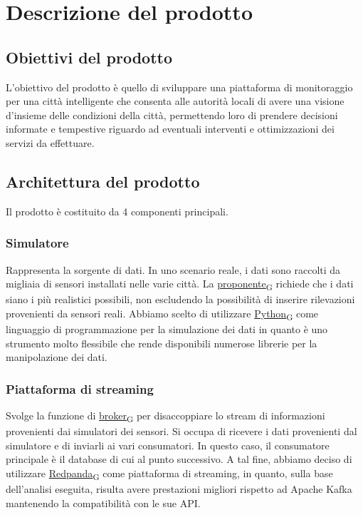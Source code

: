 \section{Descrizione del prodotto}
\subsection{Obiettivi del prodotto}
L'obiettivo del prodotto è quello di sviluppare una piattaforma di monitoraggio per una città intelligente che consenta alle autorità locali di avere una visione d'insieme delle condizioni della città, permettendo loro di prendere decisioni informate e tempestive riguardo ad eventuali interventi e ottimizzazioni dei servizi da effettuare.

\subsection{Architettura del prodotto}
Il prodotto è costituito da 4 componenti principali.
	\subsubsection*{Simulatore} 
	Rappresenta la sorgente di dati. In uno scenario reale, i dati sono raccolti da migliaia di sensori installati nelle varie città. La \href{https://7last.github.io/docs/rtb/documentazione-interna/glossario\#proponente}{proponente\textsubscript{G}} richiede che i dati siano i più realistici possibili, non escludendo la possibilità di inserire rilevazioni provenienti da sensori reali. Abbiamo scelto di utilizzare \href{https://7last.github.io/docs/rtb/documentazione-interna/glossario\#python}{Python\textsubscript{G}} come linguaggio di programmazione per la simulazione dei dati in quanto è uno strumento molto flessibile che rende disponibili numerose librerie per la manipolazione dei dati.
	\subsubsection*{Piattaforma di streaming}
	Svolge la funzione di \href{https://7last.github.io/docs/rtb/documentazione-interna/glossario\#broker}{broker\textsubscript{G}} per disaccoppiare lo stream di informazioni provenienti dai simulatori dei sensori. Si occupa di ricevere i dati provenienti dal simulatore e di inviarli ai vari consumatori. In questo caso, il consumatore principale è il database di cui al punto successivo. A tal fine, abbiamo deciso di utilizzare \href{https://7last.github.io/docs/rtb/documentazione-interna/glossario\#Redpanda}{Redpanda\textsubscript{G}} come piattaforma di streaming, in quanto, sulla base dell'analisi eseguita, risulta avere prestazioni migliori rispetto ad Apache Kafka mantenendo la compatibilità con le sue API.

